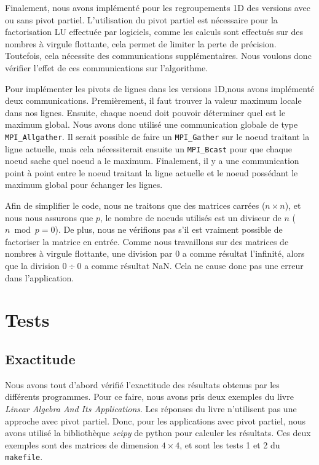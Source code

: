 \documentclass[12pt,letterpaper]{article} %
\begin{document}
Finalement, nous avons implémenté pour les regroupements 1D des versions avec ou sans
pivot partiel. L'utilisation du pivot partiel est nécessaire pour la factorisation LU
effectuée par logiciels, comme les calculs sont effectués sur des nombres à 
virgule flottante, cela permet de limiter la perte de précision. 
Toutefois, cela nécessite des communications supplémentaires. Nous voulons donc vérifier 
l'effet de ces communications sur l'algorithme. 

Pour implémenter les pivots de lignes dans
les versions 1D,nous avons implémenté deux communications. Premièrement, il faut trouver
la valeur maximum locale dans nos lignes. Ensuite, chaque noeud doit pouvoir déterminer
quel est le maximum global. Nous avons donc utilisé une communication globale de type
\texttt{MPI\_Allgather}. Il serait possible de faire un \texttt{MPI\_Gather} sur le noeud
traitant la ligne actuelle, mais cela nécessiterait ensuite un \texttt{MPI\_Bcast} pour que chaque
noeud sache quel noeud a le maximum. Finalement, il y a une communication point à point
entre le noeud traitant la ligne actuelle et le noeud possédant le maximum global pour
échanger les lignes.

Afin de simplifier le code, nous ne traitons que des matrices carrées ($n\times n$), et
nous nous assurons que $p$, le nombre de noeuds utilisés est un diviseur de $n$ ($n\bmod p = 0$).
De plus, nous ne vérifions pas s'il est vraiment possible de factoriser la matrice en entrée.
Comme nous travaillons sur des matrices de nombres à virgule flottante, une division par 0 
a comme résultat l'infinité, alors que la division $0\div 0$ a comme résultat NaN. Cela ne
cause donc pas une erreur dans l'application.

\section{Tests}

\subsection{Exactitude}
Nous avons tout d'abord vérifié l'exactitude des résultats obtenus par les différents programmes.
Pour ce faire, nous avons pris deux exemples du livre \emph{Linear Algebra And Its Applications}.
Les réponses du livre n'utilisent pas une approche avec pivot partiel. Donc, pour les applications
avec pivot partiel, nous avons utilisé la bibliothèque \emph{scipy} de python pour calculer les résultats.
Ces deux exemples sont des matrices de dimension $4\times 4$, et sont les tests 1 et 2 du 
\texttt{makefile}.
\end{document}

